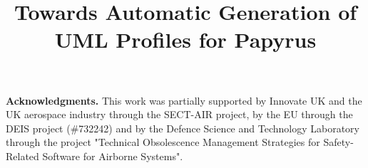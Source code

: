 \documentclass[conference]{IEEEtran}
\begin{document}
\title{Towards Automatic Generation of \\ UML Profiles for Papyrus}

\author{
	}

\maketitle{}










\noindent\textbf{Acknowledgments.}
This work was partially supported by Innovate UK and the UK aerospace industry 
through the SECT-AIR project, by the EU through the DEIS project (\#732242) and 
by the Defence Science and Technology Laboratory through the project "Technical 
Obsolescence Management Strategies for Safety-Related Software for Airborne 
Systems".

\clearpage


\end{document}
